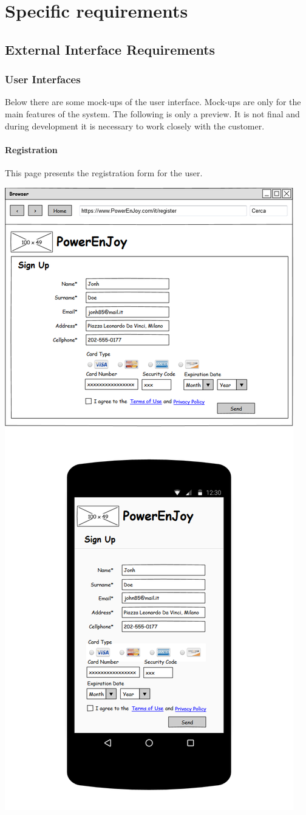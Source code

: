 \documentclass{article}
\begin{document}
	
	
	\section{Specific requirements}
		\subsection{External Interface Requirements} 
			\subsubsection{User Interfaces}
			Below there are some mock-ups of the user interface. Mock-ups are only for the main features of the system. The following is only a preview. It is not final and during development it is necessary to work closely with the customer.
			
			\pagebreak
			\paragraph{Registration} This page presents the registration form for the user.
			\begin{center}
				\includegraphics[width=0.6\linewidth]{"img/ui/registration"}
			\end{center}
			\pagebreak
\end{document}
